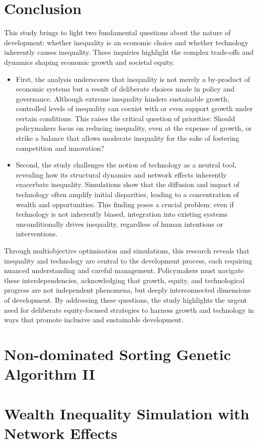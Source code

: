 \documentclass[12pt]{article}
\begin{document}
\section{Conclusion} 
This study brings to light two fundamental questions about the nature of development: whether inequality is an economic choice and whether technology inherently causes inequality. These inquiries highlight the complex trade-offs and dynamics shaping economic growth and societal equity.
\begin{itemize}
    \item First, the analysis underscores that inequality is not merely a by-product of economic systems but a result of deliberate choices made in policy and governance. Although extreme inequality hinders sustainable growth, controlled levels of inequality can coexist with or even support growth under certain conditions. This raises the critical question of priorities: Should policymakers focus on reducing inequality, even at the expense of growth, or strike a balance that allows moderate inequality for the sake of fostering competition and innovation?
    \item Second, the study challenges the notion of technology as a neutral tool, revealing how its structural dynamics and network effects inherently exacerbate inequality. Simulations show that the diffusion and impact of technology often amplify initial disparities, leading to a concentration of wealth and opportunities. This finding poses a crucial problem: even if technology is not inherently biased,  integration into existing systems unconditionally drives inequality, regardless of human intentions or interventions.
\end{itemize}

Through multiobjective optimisation and simulations, this research reveals that inequality and technology are central to the development process, each requiring nuanced understanding and careful management. Policymakers must navigate these interdependencies, acknowledging that growth, equity, and technological progress are not independent phenomena, but deeply interconnected dimensions of development. By addressing these questions, the study highlights the urgent need for deliberate equity-focused strategies to harness growth and technology in ways that promote inclusive and sustainable development.

\newpage
\printbibliography

\newpage
\appendix
\small
\section{Non-dominated Sorting Genetic Algorithm II} \label{ap:NSGA}

\newpage
\section{Wealth Inequality Simulation with Network Effects}
\label{ap:simulation}

\end{document}
